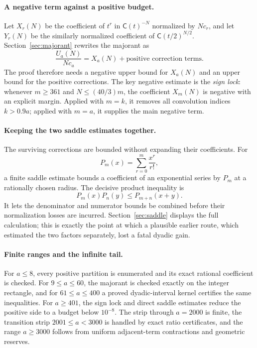 \documentclass[11pt]{article}
\theoremstyle{definition}
\theoremstyle{remark}
\newcommand{\C}{\mathsf C}
\begin{document}
\paragraph{A negative term against a positive budget.}
Let $X_r(N)$ be the coefficient of $t^r$ in $\C(t)^{-N}$ normalized by
$Nc_r$, and let $Y_r(N)$ be the similarly normalized coefficient of
$\C(t/2)^{N/2}$.  Section~\ref{sec:majorant} rewrites the majorant as
\[
  \frac{U_a(N)}{Nc_a}=X_a(N)+\text{positive correction terms}.
\]
The proof therefore needs a negative upper bound for $X_a(N)$ and an upper
bound for the positive corrections.  The key negative estimate is the
\emph{sign lock}: whenever $m\ge361$ and $N\le(40/3)m$, the coefficient
$X_m(N)$ is negative with an explicit margin.  Applied with $m=k$, it removes
all convolution indices $k>0.9a$; applied with $m=a$, it supplies the main
negative term.

\paragraph{Keeping the two saddle estimates together.}
The surviving corrections are bounded without expanding their coefficients.
For
\[
  P_m(x)=\sum_{r=0}^m\frac{x^r}{r!},
\]
a finite saddle estimate bounds a coefficient of an exponential series by
$P_m$ at a rationally chosen radius.  The decisive product inequality is
\[
  P_m(x)P_n(y)\le P_{m+n}(x+y).
\]
It lets the denominator and numerator bounds be combined before their
normalization losses are incurred.  Section~\ref{sec:saddle} displays the full
calculation; this is exactly the point at which a plausible earlier route,
which estimated the two factors separately, lost a fatal dyadic gain.

\paragraph{Finite ranges and the infinite tail.}
For $a\le8$, every positive partition is enumerated and its exact rational
coefficient is checked.  For $9\le a\le60$, the majorant is checked exactly on
the integer rectangle, and for $61\le a\le400$ a proved dyadic-interval kernel
certifies the same inequalities.  For $a\ge401$, the sign lock and direct
saddle estimates reduce the positive side to a budget below $10^{-8}$.  The
strip through $a=2000$ is finite, the transition strip $2001\le a<3000$ is
handled by exact ratio certificates, and the range $a\ge3000$ follows from
uniform adjacent-term contractions and geometric reserves.
\end{document}

